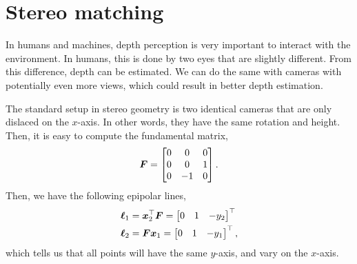 \section{Stereo matching}

In humans and machines, depth perception is very important to interact with the
environment. In humans, this is done by two eyes that are slightly different.
From this difference, depth can be estimated. We can do the same with cameras
with potentially even more views, which could result in better depth
estimation.


The standard setup in stereo geometry is two identical cameras that are only
dislaced on the $x$-axis. In other words, they have the same rotation and
height. Then, it is easy to compute the fundamental matrix, \[
  \bm{F} = \begin{bmatrix} 0 & 0 & 0 \\ 0 & 0 & 1 \\ 0 & -1 & 0 \end{bmatrix}
.\]
Then, we have the following epipolar lines,
\begin{align*}
  \bm{\ell}_1 &= \bm{x}_2^\top \bm{F} = \begin{bmatrix} 0 & 1 & -y_2 \end{bmatrix}^\top \\
  \bm{\ell}_2 &= \bm{F} \bm{x}_1 = \begin{bmatrix} 0 & 1 & -y_1 \end{bmatrix}^\top
,\end{align*}
which tells us that all points will have the same $y$-axis, and vary on the
$x$-axis.

